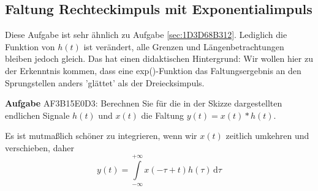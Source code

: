 \documentclass[11pt,a4paper,DIV=12]{scrartcl}
\numberwithin{equation}{section}
\numberwithin{figure}{section}
\newcommand\fsd{\mathrm{d}} %
\begin{document}
\clearpage
\subsection{Faltung Rechteckimpuls mit Exponentialimpuls}
\label{sec:AF3B15E0D3}
\begin{Ziel}
Diese Aufgabe ist sehr ähnlich zu Aufgabe \ref{sec:1D3D68B312}.
Lediglich die Funktion von $h(t)$ ist verändert, alle Grenzen und
Längenbetrachtungen bleiben jedoch gleich. Das hat einen didaktischen
Hintergrund: Wir wollen hier zu der Erkenntnis kommen, dass eine exp()-Funktion
das Faltungsergebnis an den Sprungstellen anders 'glättet' als der Dreiecksimpuls.
\end{Ziel}
\textbf{Aufgabe} {\tiny AF3B15E0D3}: Berechnen Sie für die in der Skizze dargestellten
endlichen Signale $h(t)$ und $x(t)$ die Faltung $y(t)=x(t) \ast h(t)$.




\begin{Werkzeug}
Es ist mutmaßlich schöner zu integrieren, wenn wir $x(t)$ zeitlich umkehren und
verschieben, daher
\begin{equation}
y(t) = \int\limits_{-\infty}^{+\infty} x(-\tau+t) h(\tau) \, \fsd \tau
\end{equation}
\end{Werkzeug}
\end{document}
